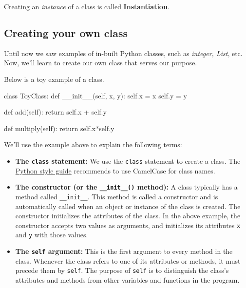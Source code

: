 \documentclass[
  letterpaper,
  DIV=11,
  numbers=noendperiod]{scrreprt}
\newenvironment{Shaded}{\begin{snugshade}}{\end{snugshade}}
\newcommand{\ControlFlowTok}[1]{\textcolor[rgb]{0.00,0.23,0.31}{#1}}
\newcommand{\FunctionTok}[1]{\textcolor[rgb]{0.28,0.35,0.67}{#1}}
\newcommand{\KeywordTok}[1]{\textcolor[rgb]{0.00,0.23,0.31}{#1}}
\newcommand{\NormalTok}[1]{\textcolor[rgb]{0.00,0.23,0.31}{#1}}
\newcommand{\OperatorTok}[1]{\textcolor[rgb]{0.37,0.37,0.37}{#1}}
\newcommand{\VariableTok}[1]{\textcolor[rgb]{0.07,0.07,0.07}{#1}}
\begin{document}
Creating an \emph{instance} of a class is called \textbf{Instantiation}.

\hypertarget{creating-your-own-class}{%
\subsection{Creating your own class}\label{creating-your-own-class}}

Until now we saw examples of in-built Python classes, such as
\emph{integer, List}, etc. Now, we'll learn to create our own class that
serves our purpose.

Below is a toy example of a class.

\begin{Shaded}
\begin{Highlighting}[]
\KeywordTok{class}\NormalTok{ ToyClass:}
    \KeywordTok{def} \FunctionTok{\_\_init\_\_}\NormalTok{(}\VariableTok{self}\NormalTok{, x, y):}
        \VariableTok{self}\NormalTok{.x }\OperatorTok{=}\NormalTok{ x}
        \VariableTok{self}\NormalTok{.y }\OperatorTok{=}\NormalTok{ y}
    
    \KeywordTok{def}\NormalTok{ add(}\VariableTok{self}\NormalTok{):}
        \ControlFlowTok{return} \VariableTok{self}\NormalTok{.x }\OperatorTok{+} \VariableTok{self}\NormalTok{.y}
    
    \KeywordTok{def}\NormalTok{ multiply(}\VariableTok{self}\NormalTok{):}
        \ControlFlowTok{return} \VariableTok{self}\NormalTok{.x}\OperatorTok{*}\VariableTok{self}\NormalTok{.y}
\end{Highlighting}
\end{Shaded}

We'll use the example above to explain the following terms:

\begin{itemize}
\item
  \textbf{The \texttt{class} statement:} We use the \texttt{class}
  statement to create a class. The
  \href{https://peps.python.org/pep-0008/\#class-names}{Python style
  guide} recommends to use CamelCase for class names.
\item
  \textbf{The constructor (or the \texttt{\_\_init\_\_()} method):} A
  class typically has a method called \texttt{\_\_init\_\_}. This method
  is called a constructor and is automatically called when an object or
  instance of the class is created. The constructor initializes the
  attributes of the class. In the above example, the constructor accepts
  two values as arguments, and initializes its attributes \texttt{x} and
  \texttt{y} with those values.
\item
  \textbf{The \texttt{self} argument:} This is the first argument to
  every method in the class. Whenever the class refers to one of its
  attributes or methods, it must precede them by \texttt{self}. The
  purpose of \texttt{self} is to distinguish the class's attributes and
  methods from other variables and functions in the program.
\end{itemize}
\end{document}
